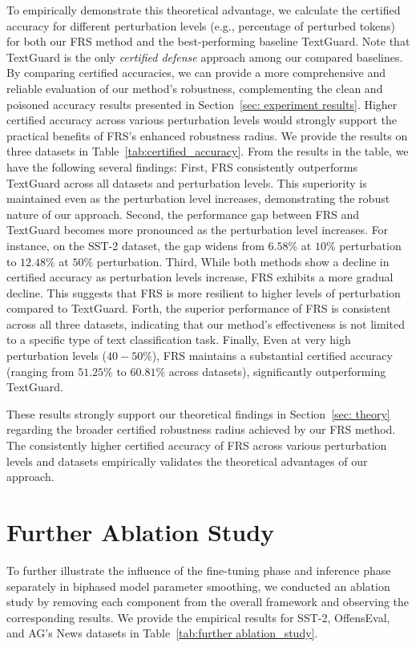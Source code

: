 To empirically demonstrate this theoretical advantage, we calculate the certified accuracy for different perturbation levels (e.g., percentage of perturbed tokens) for both our FRS method and the best-performing baseline TextGuard. Note that TextGuard is the only \textit{certified defense} approach among our compared baselines. By comparing certified accuracies, we can provide a more comprehensive and reliable evaluation of our method's robustness, complementing the clean and poisoned accuracy results presented in Section~\ref{sec: experiment results}. Higher certified accuracy across various perturbation levels would strongly support the practical benefits of FRS's enhanced robustness radius. We provide the results on three datasets in Table~\ref{tab:certified_accuracy}. From the results in the table, we have the following several findings: First, FRS consistently outperforms TextGuard across all datasets and perturbation levels. This superiority is maintained even as the perturbation level increases, demonstrating the robust nature of our approach. Second, the performance gap between FRS and TextGuard becomes more pronounced as the perturbation level increases. For instance, on the SST-2 dataset, the gap widens from $6.58\%$ at $10\%$ perturbation to $12.48\%$ at $50\%$ perturbation. Third,  While both methods show a decline in certified accuracy as perturbation levels increase, FRS exhibits a more gradual decline. This suggests that FRS is more resilient to higher levels of perturbation compared to TextGuard. Forth, the superior performance of FRS is consistent across all three datasets, indicating that our method's effectiveness is not limited to a specific type of text classification task. Finally, Even at very high perturbation levels ($40-50\%$), FRS maintains a substantial certified accuracy (ranging from $51.25\%$ to $60.81\%$ across datasets), significantly outperforming TextGuard.

These results strongly support our theoretical findings in Section~\ref{sec: theory} regarding the broader certified robustness radius achieved by our FRS method. The consistently higher certified accuracy of FRS across various perturbation levels and datasets empirically validates the theoretical advantages of our approach.
\vspace{-2mm}

\section{Further Ablation Study}
\label{appendix: further ablation study}
To further illustrate the influence of the fine-tuning phase and inference phase separately in biphased model parameter smoothing, we conducted an ablation study by removing each component from the overall framework and observing the corresponding results. We provide the empirical results for SST-2, OffensEval, and AG's News datasets in Table~\ref{tab:further ablation_study}. 

